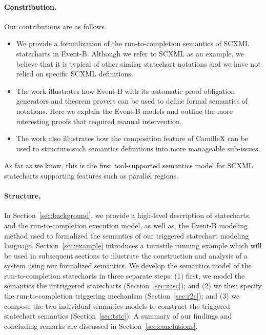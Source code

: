 \paragraph{Constribution.} Our contributions are as follows.
\begin{itemize}
    \item We provide a formalization of the run-to-completion  semantics of SCXML statecharts in Event-B. Although we  refer to SCXML as  an example, we believe that it is  typical of  other similar statechart  notations and we have not  relied on specific SCXML  definitions. 
    \item The work illustrates how Event-B with its automatic proof obligation generators and theorem provers can be used to  define  formal  semantics of  notations. Here we  explain the Event-B models  and outline the more interesting proofs  that  required manual intervention.
    \item The work also illustrates how the composition feature of CamilleX can be used to structure such semantics definitions into more  manageable sub-issues.
\end{itemize}
As far as we know, this is the first tool-supported semantics model for SCXML statecharts supporting features such as parallel regions.

\paragraph{Structure.} In Section~\ref{sec:background}, we provide a high-level description of statecharts, and the run-to-completion execution model, as well as, the Event-B modeling method used to formalized the semantics of our triggered statechart modeling language. Section~\ref{sec:example} introduces a turnstile running example which will be used in subsequent sections to illustrate the construction and analysis of a system using our formalized semantics.  We develop the semantics model of the run-to-completion statecharts in three separate steps: (1) first, we model the semantics the untriggered statecharts (Section~\ref{sec:utsc}); and (2) we then specify the run-to-completion triggering mechanism (Section~\ref{sec:r2c}); and (3) we compose the two individual semantics models to construct the triggered statechart semantics (Section~\ref{sec:tstc}).
A summary of our findings and concluding remarks are discussed in Section~\ref{sec:conclusions}.